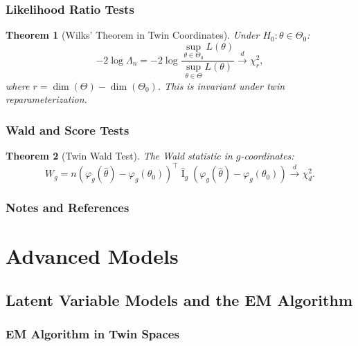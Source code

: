 \documentclass[11pt,twoside]{book}
\theoremstyle{plain}
\newtheorem{theorem}{Theorem}[chapter]
\theoremstyle{definition}
\theoremstyle{remark}
\DeclareMathOperator{\Fisher}{I}
\begin{document}
\section{Likelihood Ratio Tests}
\label{sec:lrt}

\begin{theorem}[Wilks' Theorem in Twin Coordinates]
    Under $H_0 : \theta \in \Theta_0$:
    \[
    -2\log \Lambda_n = -2\log \frac{\sup_{\theta \in \Theta_0} L(\theta)}{\sup_{\theta \in \Theta} L(\theta)} \stackrel{d}{\to} \chi^2_r,
    \]
    where $r = \dim(\Theta) - \dim(\Theta_0)$. This is invariant under twin reparameterization.
\end{theorem}

\section{Wald and Score Tests}
\label{sec:wald_score}

\begin{theorem}[Twin Wald Test]
    The Wald statistic in $g$-coordinates:
    \[
    W_g = n(\varphi_g(\hat{\theta}) - \varphi_g(\theta_0))^\top \hat{\Fisher}_g (\varphi_g(\hat{\theta}) - \varphi_g(\theta_0)) \stackrel{d}{\to} \chi^2_d.
    \]
\end{theorem}

\section{Notes and References}
\label{sec:ch13_notes}


\part{Advanced Models}
\label{part:advanced}


\chapter{Latent Variable Models and the EM Algorithm}
\label{ch:em}

\section{EM Algorithm in Twin Spaces}
\label{sec:em_twin}
\end{document}
